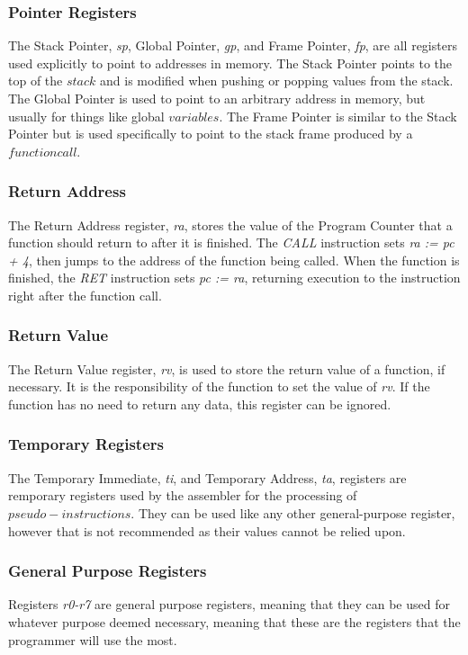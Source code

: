 \subsubsection{Pointer Registers}
The Stack Pointer, \textit{sp}, Global Pointer, \textit{gp}, and Frame Pointer, \textit{fp}, are all registers used explicitly to point to addresses in memory.
The Stack Pointer points to the top of the $stack$ and is modified when pushing or popping values from the stack.
The Global Pointer is used to point to an arbitrary address in memory, but usually for things like global $variables$.
The Frame Pointer is similar to the Stack Pointer but is used specifically to point to the stack frame produced by a $function call$. 

\subsubsection{Return Address}
The Return Address register, \textit{ra}, stores the value of the Program Counter that a function should return to after it is finished.
The \textit{CALL} instruction sets \textit{ra := pc + 4}, then jumps to the address of the function being called.
When the function is finished, the \textit{RET} instruction sets \textit{pc := ra}, returning execution to the instruction right after the function call.

\subsubsection{Return Value}
The Return Value register, \textit{rv}, is used to store the return value of a function, if necessary.
It is the responsibility of the function to set the value of \textit{rv}.
If the function has no need to return any data, this register can be ignored.

\subsubsection{Temporary Registers}
The Temporary Immediate, \textit{ti}, and Temporary Address, \textit{ta}, registers are remporary registers used by the assembler for the processing of $pseudo-instructions$.
They can be used like any other general-purpose register, however that is not recommended as their values cannot be relied upon.

\subsubsection{General Purpose Registers}
Registers \textit{r0-r7} are general purpose registers, meaning that they can be used for whatever purpose deemed necessary, meaning that these are the registers that the programmer will use the most.
